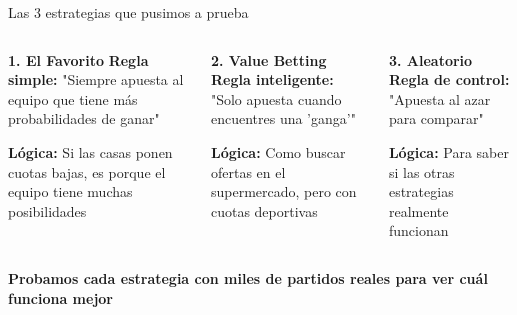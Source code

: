 \documentclass[aspectratio=169]{beamer}
\begin{document}
\begin{frame}{Las 3 estrategias que pusimos a prueba}
\begin{columns}
\begin{column}{0.33\textwidth}
\begin{block}{\textcolor{azulprincipal}{\textbf{1. El Favorito}}}
\textbf{Regla simple:}
"Siempre apuesta al equipo que tiene más probabilidades de ganar"

\vspace{0.3cm}
\textbf{Lógica:}
Si las casas ponen cuotas bajas, es porque el equipo tiene muchas posibilidades
\end{block}
\end{column}

\begin{column}{0.33\textwidth}
\begin{block}{\textcolor{verdeganancia}{\textbf{2. Value Betting}}}
\textbf{Regla inteligente:}
"Solo apuesta cuando encuentres una 'ganga'"

\vspace{0.3cm}
\textbf{Lógica:}
Como buscar ofertas en el supermercado, pero con cuotas deportivas
\end{block}
\end{column}

\begin{column}{0.33\textwidth}
\begin{block}{\textcolor{rojoperdida}{\textbf{3. Aleatorio}}}
\textbf{Regla de control:}
"Apuesta al azar para comparar"

\vspace{0.3cm}
\textbf{Lógica:}
Para saber si las otras estrategias realmente funcionan
\end{block}
\end{column}
\end{columns}

\vspace{0.5cm}
\begin{center}
\textbf{Probamos cada estrategia con miles de partidos reales para ver cuál funciona mejor}
\end{center}
\end{frame}
\end{document}
